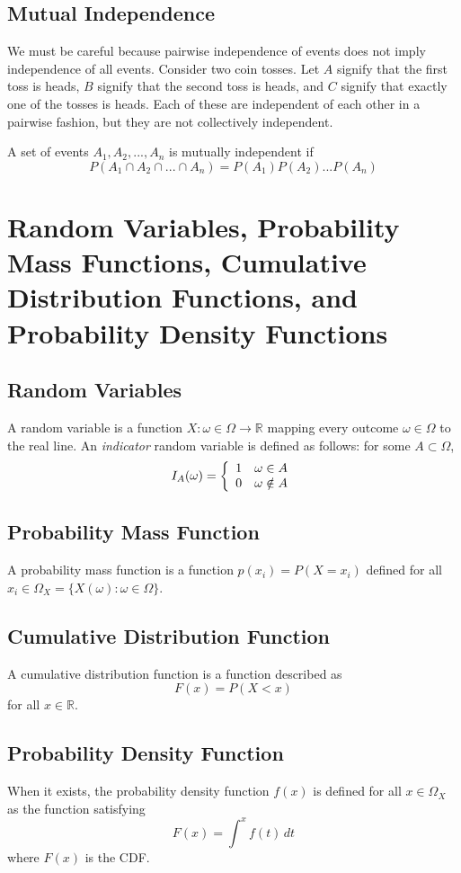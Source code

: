 \documentclass[10pt]{article}
\begin{document}
\subsection*{Mutual Independence}
We must be careful because pairwise independence of events does not imply independence of all events. Consider two coin tosses. Let $A$ signify that the first toss is heads, $B$ signify that the second toss is heads, and $C$ signify that exactly one of the tosses is heads. Each of these are independent of each other in a pairwise fashion, but they are not collectively independent.

A set of events $A_1, A_2, ..., A_n$ is mutually independent if \[ P(A_1 \cap A_2 \cap ... \cap A_n) = P(A_1)P(A_2)...P(A_n) \]

\section*{Random Variables, Probability Mass Functions, Cumulative Distribution Functions, and Probability Density Functions}
\subsection*{Random Variables}
A random variable is a function $X \colon \omega \in \Omega \rightarrow \mathbb{R}$ mapping every outcome $\omega \in \Omega$ to the real line. An \textit{indicator} random variable is defined as follows: for some $A \subset \Omega$,
\[
I_A(\omega) = \left\{
\begin{array}{c l}
  1 & \omega \in A \\
  0 & \omega \notin A
\end{array}
\right.
\]

\subsection*{Probability Mass Function}
A probability mass function is a function $p(x_i) = P(X = x_i)$ defined for all $x_i \in \Omega_X = \{ X(\omega) : \omega \in \Omega \} $.

\subsection*{Cumulative Distribution Function}
A cumulative distribution function is a function described as \[ F(x) = P(X < x) \] for all $x \in \mathbb{R}$.

\subsection*{Probability Density Function}
When it exists, the probability density function $f(x)$ is defined for all $x \in \Omega_X$ as the function satisfying \[ F(x) = \int^x \! f(t) \, dt \] where $F(x)$ is the CDF.
\end{document}
